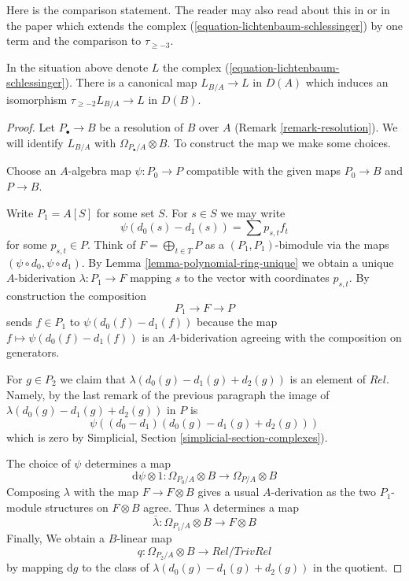 \noindent
Here is the comparison statement. The reader may also read about this
in \cite[page 206, Proposition 12]{Andre-Homologie} or in the paper
\cite{Doncel} which extends the complex
(\ref{equation-lichtenbaum-schlessinger}) by one term and the comparison
to $\tau_{\geq -3}$.

\begin{lemma}
\label{lemma-compare-higher}
In the situation above denote $L$ the complex
(\ref{equation-lichtenbaum-schlessinger}).
There is a canonical map $L_{B/A} \to L$ in $D(A)$ which
induces an isomorphism $\tau_{\geq -2}L_{B/A} \to L$ in $D(B)$.
\end{lemma}

\begin{proof}
Let $P_\bullet \to B$ be a resolution of $B$ over $A$
(Remark \ref{remark-resolution}). We will identify $L_{B/A}$ with
$\Omega_{P_\bullet/A} \otimes B$. To construct the map we
make some choices.

\medskip\noindent
Choose an $A$-algebra map $\psi : P_0 \to P$ compatible with the
given maps $P_0 \to B$ and $P \to B$.

\medskip\noindent
Write $P_1 = A[S]$ for some set $S$. For $s \in S$ we may write
$$
\psi(d_0(s) - d_1(s)) = \sum p_{s, t} f_t
$$
for some $p_{s, t} \in P$. Think of $F = \bigoplus_{t \in T} P$
as a $(P_1, P_1)$-bimodule via the maps $(\psi \circ d_0, \psi \circ d_1)$.
By Lemma \ref{lemma-polynomial-ring-unique} we obtain a unique
$A$-biderivation $\lambda : P_1 \to F$ mapping $s$ to the vector with
coordinates $p_{s, t}$. By construction the composition
$$
P_1 \longrightarrow F \longrightarrow P
$$
sends $f \in P_1$ to $\psi(d_0(f) - d_1(f))$ because the map
$f \mapsto \psi(d_0(f) - d_1(f))$ is an $A$-biderivation agreeing with
the composition on generators.

\medskip\noindent
For $g \in P_2$ we claim that $\lambda(d_0(g) - d_1(g) + d_2(g))$
is an element of $Rel$. Namely, by the last remark of the previous
paragraph the image of $\lambda(d_0(g) - d_1(g) + d_2(g))$ in $P$ is
$$
\psi((d_0 - d_1)(d_0(g) - d_1(g) + d_2(g)))
$$
which is zero by Simplicial, Section \ref{simplicial-section-complexes}).

\medskip\noindent
The choice of $\psi$ determines a map
$$
\text{d}\psi \otimes 1 :
\Omega_{P_0/A} \otimes B
\longrightarrow
\Omega_{P/A} \otimes B
$$
Composing $\lambda$ with the map $F \to F \otimes B$ gives a
usual $A$-derivation as the two $P_1$-module structures on
$F \otimes B$ agree. Thus $\lambda$ determines a map
$$
\overline{\lambda} :
\Omega_{P_1/A} \otimes B
\longrightarrow
F \otimes B
$$
Finally, We obtain a $B$-linear map
$$
q :
\Omega_{P_2/A} \otimes B
\longrightarrow
Rel/TrivRel
$$
by mapping $\text{d}g$ to the class of $\lambda(d_0(g) - d_1(g) + d_2(g))$
in the quotient.


\end{proof}
